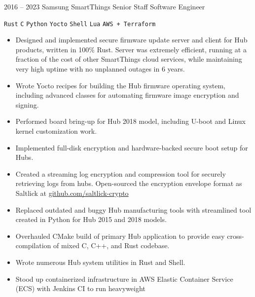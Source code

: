 \documentclass[10pt, letterpaper]{developercv}
\begin{document}
\begin{entrylist}
    \entry
        {2016 -- 2023}
        {Samsung SmartThings}
        {Senior Staff Software Engineer}
        {%
            \texttt{Rust}\slashsep
            \texttt{C}\slashsep
            \texttt{Python}\slashsep
            \texttt{Yocto}\slashsep
            \texttt{Shell}\slashsep
            \texttt{Lua}\slashsep
            \texttt{AWS + Terraform}
            \begin{itemize}[nosep]
                \item Designed and implemented secure firmware update server
                    and client for Hub products, written in 100\% Rust. Server
                    was extremely efficient, running at a fraction of the cost
                    of other SmartThings cloud services, while maintaining very
                    high uptime with no unplanned outages in 6 years.
                \item Wrote Yocto recipes for building the Hub firmware
                    operating system, including advanced classes for automating
                    firmware image encryption and signing.
                \item Performed board bring-up for Hub 2018 model, including
                    U-boot and Linux kernel customization work.
                \item Implemented full-disk encryption and hardware-backed
                    secure boot setup for Hubs.
                \item Created a streaming log encryption and compression tool
                    for securely retrieving logs from hubs. Open-sourced the
                    encryption envelope format as Saltlick at
                    \href{https://github.com/saltlick-crypto}{github.com/saltlick-crypto}
                \item Replaced outdated and buggy Hub manufacturing tools with
                    streamlined tool created in Python for Hub 2015 and 2018
                    models.
                \item Overhauled CMake build of primary Hub application to
                    provide easy cross-compilation of mixed C, C++, and Rust
                    codebase.
                \item Wrote numerous Hub system utilities in Rust and Shell.
                \item Stood up containerized infrastructure in AWS Elastic
                    Container Service (ECS) with Jenkins CI to run heavyweight

\end{itemize}}
\end{entrylist}
\end{document}
